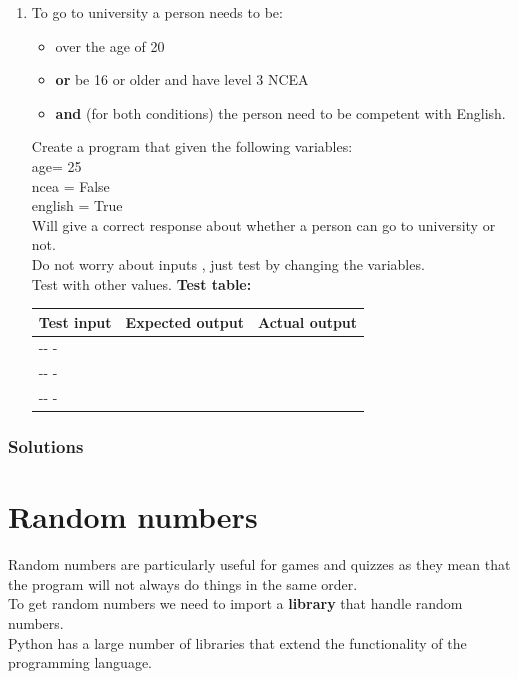 \documentclass[a4paper,12pt]{article}
\begin{document}
\begin{enumerate}[label=\normalsize \alph*)~~~ , topsep=8pt,itemsep=25pt,partopsep=4pt, parsep=4pt, leftmargin = 0.5cm]
\item 	To go to university a person needs to be:
\begin{itemize}
	\item over the age of 20
	\item \textbf{or} be 16 or older and have level 3 NCEA 
	\item \textbf{and} (for both conditions) the person need to be competent with English.
\end{itemize} 
Create a program that given the following variables:\\
age= 25\\
ncea = False\\
english = True\\
Will give a correct response about whether a person can go to university or not.\\
Do not worry about inputs , just test by changing the variables.\\
Test with other values.
	\textbf{Test table:}\\
		\begin{tabular}{| p{5cm} | p{5cm} | p{5cm} |}\hline
		Test input& Expected output & Actual output\\\hline
		-\newline - \newline -&  &  \\\hline
		-\newline - \newline -&  &  \\\hline
		-\newline - \newline -&  &  \\\hline
	\end{tabular}
\end{enumerate}

\newpage
\subsubsection{Solutions}

\newpage

\section{Random numbers}
Random numbers are particularly useful for games and quizzes as they mean that the program will not always do things in the same order.\\
To get random numbers we need to import a \textbf{library} that handle random numbers.\\
Python has a large number of libraries that extend the functionality of the programming language.
\end{document}
